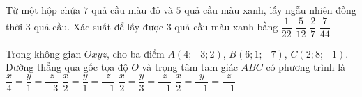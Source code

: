 \begin{ex}%
	Từ một hộp chứa $7$ quả cầu màu đỏ và $5$ quả cầu màu xanh, lấy ngẫu nhiên đồng thời $3$ quả cầu. Xác suất để lấy được $3$ quả cầu màu xanh bằng
	\choice
	{\True $\dfrac{1}{22}$}
	{$\dfrac{5}{12}$}
	{$\dfrac{2}{7}$}
	{$\dfrac{7}{44}$}
\end{ex}
\begin{ex}%
	Trong không gian $Oxyz$, cho ba điểm $A(4;-3;2)$, $B(6;1;-7)$, $C(2;8;-1)$. Đường thẳng qua gốc tọa độ $O$ và trọng tâm tam giác $ABC$ có phương trình là
	\choice
	{$\dfrac{x}{4}=\dfrac{y}{1}=\dfrac{z}{-3}$}
	{\True $\dfrac{x}{2}=\dfrac{y}{1}=\dfrac{z}{-1}$}
	{$\dfrac{x}{2}=\dfrac{y}{3}=\dfrac{z}{-1}$}
	{$\dfrac{x}{2}=\dfrac{y}{-1}=\dfrac{z}{-1}$}
\end{ex}
